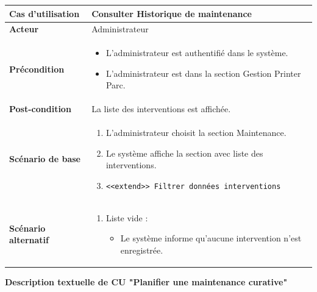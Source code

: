 \documentclass[a4paper,11pt]{report}
\begin{document}
\begin{tabularx}{\textwidth}{|>{\bfseries}l|X|}
\hline
Cas d’utilisation    & Consulter Historique de maintenance \\
\hline
Acteur               & Administrateur \\
\hline
Précondition         &
\begin{itemize}[left=0pt]
  \item L’administrateur est authentifié dans le système.
  \item L’administrateur est dans la section Gestion Printer Parc.

\end{itemize} \\
\hline
Post-condition       & La liste des interventions est affichée. \\
\hline
Scénario de base     &
\begin{enumerate}[left=0pt]
  \item L'administrateur choisit la section Maintenance.
  \item Le système affiche la section avec liste des interventions.
  \item \texttt{<<extend>> Filtrer données interventions}
\end{enumerate} \\
\hline
Scénario alternatif   &
\begin{enumerate}[label=\arabic*.a,wide=0pt]
  \item[2.a] Liste vide :
    \begin{itemize}[left=1em]
      \item Le système informe qu’aucune intervention n’est enregistrée.
    \end{itemize}
\end{enumerate} \\
\hline
\end{tabularx}

\newpage
\textbf{Description textuelle de CU "Planifier une maintenance curative"}
\end{document}
